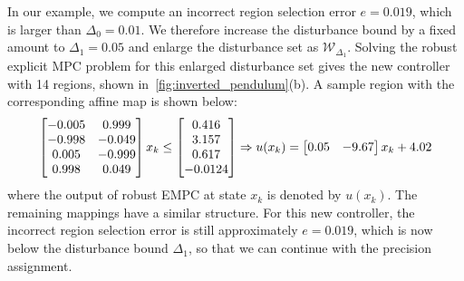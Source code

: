 In our example, we compute an incorrect region selection error $e = 0.019$, which is larger
than $\Delta_0=0.01$. We therefore increase the disturbance bound by a fixed amount to
$\Delta_1 = 0.05$ and enlarge the disturbance set as $\mathcal W_{\Delta_1}$. 
%
%
Solving the robust explicit MPC problem for this enlarged disturbance set gives the new controller
with 14 regions, shown in~\autoref{fig:inverted_pendulum}(b).
A sample region with the corresponding affine map is shown below:
\begin{equation*}
\resizebox{.9\hsize}{!}{$
\begin{bmatrix}
-0.005  &0.999\\
-0.998  &-0.049\\
0.005  &-0.999\\
0.998   &0.049
\end{bmatrix}x_k\leq 
\begin{bmatrix}
0.416\\
3.157\\
0.617\\
-0.0124
\end{bmatrix}
\Rightarrow
u(x_k)=\begin{bmatrix}
0.05&-9.67
\end{bmatrix}x_k+4.02$}
\end{equation*}
where the output of robust EMPC at state $x_k$ is denoted by $u(x_k)$. 
The remaining mappings have a similar structure.
For this new controller, the incorrect region selection error is still
approximately $e = 0.019$, which is now below the disturbance bound $\Delta_1$,
so that we can continue with the precision assignment.

